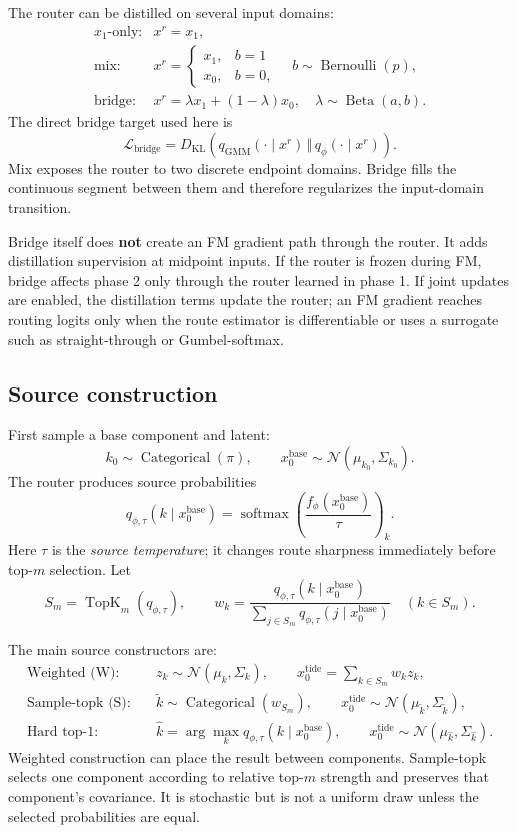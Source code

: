 \documentclass[11pt,a4paper]{article}
\newcommand{\kl}{D_{\mathrm{KL}}}
\begin{document}
The router can be distilled on several input domains:
\[
\begin{array}{ll}
\text{\(x_1\)-only:} & x^r=x_1,\\[2mm]
\text{mix:} &
x^r=\begin{cases}x_1,&b=1\\x_0,&b=0,\end{cases}
\quad b\sim\operatorname{Bernoulli}(p),\\[4mm]
\text{bridge:} &
x^r=\lambda x_1+(1-\lambda)x_0,\quad
\lambda\sim\operatorname{Beta}(a,b).
\end{array}
\]
The direct bridge target used here is
\[
 \mathcal L_{\mathrm{bridge}}
 =\kl\!\left(
 q_{\mathrm{GMM}}(\cdot\mid x^r)
 \,\Vert\,
 q_\phi(\cdot\mid x^r)
 \right).
\]
Mix exposes the router to two discrete endpoint domains. Bridge fills the
continuous segment between them and therefore regularizes the input-domain
transition.

Bridge itself does \textbf{not} create an FM gradient path through the router.
It adds distillation supervision at midpoint inputs. If the router is frozen
during FM, bridge affects phase 2 only through the router learned in phase 1.
If joint updates are enabled, the distillation terms update the router; an FM
gradient reaches routing logits only when the route estimator is differentiable
or uses a surrogate such as straight-through or Gumbel-softmax.

\subsection{Source construction}

First sample a base component and latent:
\[
 k_0\sim\operatorname{Categorical}(\pi),\qquad
 x_0^{\mathrm{base}}\sim\mathcal N(\mu_{k_0},\Sigma_{k_0}).
\]
The router produces source probabilities
\[
 q_{\phi,\tau}(k\mid x_0^{\mathrm{base}})
 =
 \operatorname{softmax}\!\left(
 \frac{f_\phi(x_0^{\mathrm{base}})}{\tau}
 \right)_k.
\]
Here \(\tau\) is the \emph{source temperature}; it changes route sharpness
immediately before top-\(m\) selection. Let
\[
 S_m=\operatorname{TopK}_m(q_{\phi,\tau}),\qquad
 w_k=
 \frac{q_{\phi,\tau}(k\mid x_0^{\mathrm{base}})}
 {\sum_{j\in S_m}q_{\phi,\tau}(j\mid x_0^{\mathrm{base}})}
 \quad(k\in S_m).
\]

The main source constructors are:
\[
\begin{aligned}
\text{Weighted (W):}\quad
&z_k\sim\mathcal N(\mu_k,\Sigma_k),\qquad
x_0^{\mathrm{tide}}=\sum_{k\in S_m}w_k z_k,\\
\text{Sample-topk (S):}\quad
&\widetilde k\sim\operatorname{Categorical}(w_{S_m}),\qquad
x_0^{\mathrm{tide}}\sim\mathcal N(\mu_{\widetilde k},\Sigma_{\widetilde k}),\\
\text{Hard top-1:}\quad
&\widehat k=\arg\max_k q_{\phi,\tau}(k\mid x_0^{\mathrm{base}}),\qquad
x_0^{\mathrm{tide}}\sim\mathcal N(\mu_{\widehat k},\Sigma_{\widehat k}).
\end{aligned}
\]
Weighted construction can place the result between components. Sample-topk
selects one component according to relative top-\(m\) strength and preserves
that component's covariance. It is stochastic but is not a uniform draw unless
the selected probabilities are equal.
\end{document}
